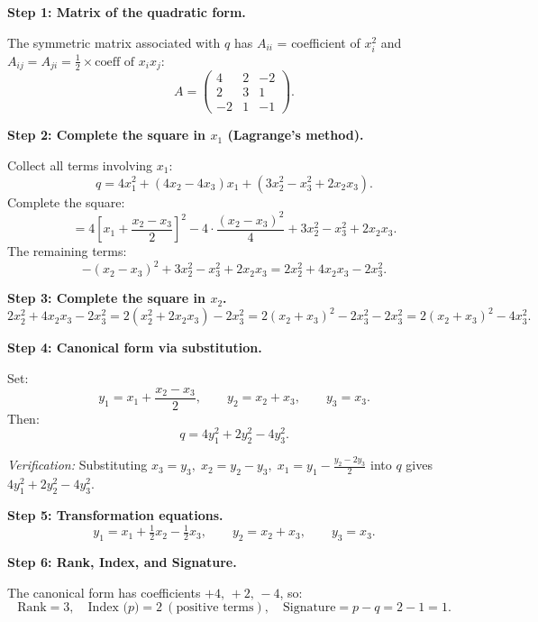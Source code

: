\documentclass[12pt,a3paper]{article}
\begin{document}
\begin{tcolorbox}[enhanced,breakable,
  colback=cE!4,colframe=cE,boxrule=0.8pt,arc=5pt,
  title={\textbf{Answer --- Quadratic Form to Canonical Form (Lagrange's Method)}},
  fonttitle=\bfseries\color{white},colbacktitle=cE]

\textbf{Step 1: Matrix of the quadratic form.}

The symmetric matrix associated with $q$ has $A_{ii}$ = coefficient of $x_i^2$ and $A_{ij}=A_{ji}=\frac{1}{2}\times\text{coeff of }x_ix_j$:
\[
A=\begin{pmatrix}4&2&-2\\2&3&1\\-2&1&-1\end{pmatrix}.
\]

\textbf{Step 2: Complete the square in $x_1$ (Lagrange's method).}

Collect all terms involving $x_1$:
\[
q = 4x_1^2 + (4x_2 - 4x_3)x_1 + (3x_2^2-x_3^2+2x_2x_3).
\]
Complete the square:
\[
= 4\!\left[x_1 + \frac{x_2-x_3}{2}\right]^2 - 4\cdot\frac{(x_2-x_3)^2}{4} + 3x_2^2-x_3^2+2x_2x_3.
\]
The remaining terms:
\[
-(x_2-x_3)^2+3x_2^2-x_3^2+2x_2x_3 = 2x_2^2+4x_2x_3-2x_3^2.
\]

\textbf{Step 3: Complete the square in $x_2$.}
\[
2x_2^2+4x_2x_3-2x_3^2 = 2(x_2^2+2x_2x_3)-2x_3^2
= 2(x_2+x_3)^2-2x_3^2-2x_3^2 = 2(x_2+x_3)^2-4x_3^2.
\]

\textbf{Step 4: Canonical form via substitution.}

Set:
\[
y_1 = x_1+\frac{x_2-x_3}{2},\qquad y_2 = x_2+x_3,\qquad y_3=x_3.
\]
Then:
\[
\boxed{q = 4y_1^2 + 2y_2^2 - 4y_3^2.}
\]

\textit{Verification:} Substituting $x_3=y_3,\;x_2=y_2-y_3,\;x_1=y_1-\tfrac{y_2-2y_3}{2}$ into $q$ gives $4y_1^2+2y_2^2-4y_3^2$.\;\checkmark

\textbf{Step 5: Transformation equations.}
\[
y_1=x_1+\tfrac{1}{2}x_2-\tfrac{1}{2}x_3,\qquad y_2=x_2+x_3,\qquad y_3=x_3.
\]

\textbf{Step 6: Rank, Index, and Signature.}

The canonical form has coefficients $+4,\,+2,\,-4$, so:
\[
\text{Rank} = 3,\quad \text{Index (}p\text{)} = 2\ (\text{positive terms}),\quad \text{Signature} = p - q = 2 - 1 = 1.
\]

\end{tcolorbox}
\end{document}
